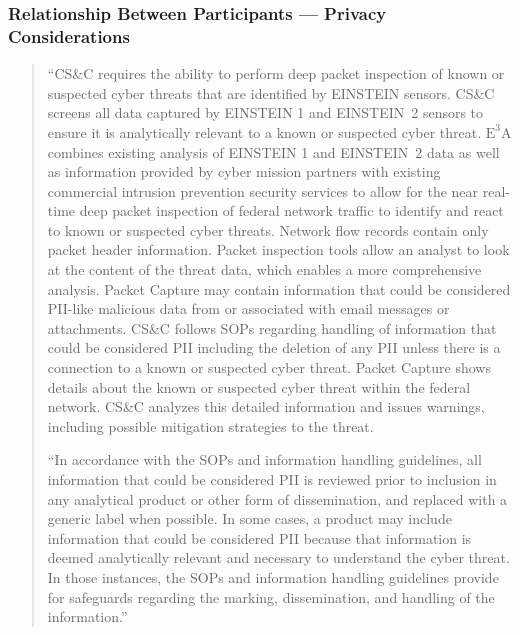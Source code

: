 \documentclass[fleqn,10pt]{wlscirep}
\newcommand{\ETA}{$\textrm{E}^\textrm{3}\textrm{A}$\xspace}
\begin{document}
\subsubsection{Relationship Between Participants --- Privacy Considerations}\label{excerpt1}
\begin{quote}
  ``CS\&C requires the ability to perform deep packet inspection of known or
suspected cyber threats that are identified by EINSTEIN sensors. CS\&C screens all data
captured by EINSTEIN 1 and EINSTEIN~2 sensors to ensure it is analytically relevant to
a known or suspected cyber threat. \ETA combines existing analysis of EINSTEIN 1 and
EINSTEIN~2 data as well as information provided by cyber mission partners with
existing commercial intrusion prevention security services to allow for the near real-time
deep packet inspection of federal network traffic to identify and react to known or
suspected cyber threats. Network flow records contain only packet header information.
Packet inspection tools allow an analyst to look at the content of the threat data, which
enables a more comprehensive analysis. Packet Capture may contain information that
could be considered PII-like malicious data from or associated with email messages or
attachments. CS\&C follows SOPs regarding handling of information that could be
considered PII including the deletion of any PII unless there is a connection to a known
or suspected cyber threat. Packet Capture shows details about the known or suspected
cyber threat within the federal network. CS\&C analyzes this detailed information and
issues warnings, including possible mitigation strategies to the threat.

  ``In accordance with the SOPs and information handling guidelines, all information
that could be considered PII is reviewed prior to inclusion in any analytical product or
other form of dissemination, and replaced with a generic label when possible. In some
cases, a product may include information that could be considered PII because that
information is deemed analytically relevant and necessary to understand the cyber threat.
In those instances, the SOPs and information handling guidelines provide for safeguards
regarding the marking, dissemination, and handling of the
information.''~\cite[p.9]{dhs-e3a-pia}
\end{quote}
\end{document}
